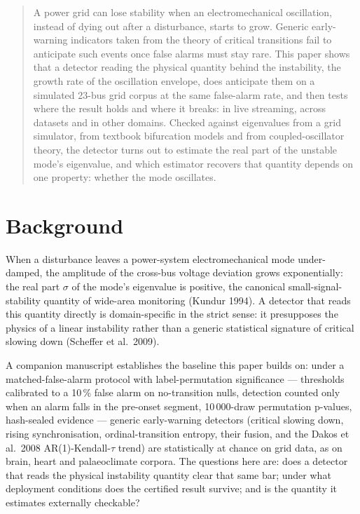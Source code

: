 \documentclass[aip,cha,preprint,amsmath,amssymb]{revtex4-2}
\begin{document}
\begin{quotation}
A power grid can lose stability when an electromechanical oscillation,
instead of dying out after a disturbance, starts to grow. Generic
early-warning indicators taken from the theory of critical transitions
fail to anticipate such events once false alarms must stay rare. This
paper shows that a detector reading the physical quantity behind the
instability, the growth rate of the oscillation envelope, does
anticipate them on a simulated 23-bus grid corpus at the same
false-alarm rate, and then tests where the result holds and where it
breaks: in live streaming, across datasets and in other domains.
Checked against eigenvalues from a grid simulator, from textbook
bifurcation models and from coupled-oscillator theory, the detector
turns out to estimate the real part of the unstable mode's eigenvalue,
and which estimator recovers that quantity depends on one property:
whether the mode oscillates.
\end{quotation}

\section{Background}\label{sec:background}

When a disturbance leaves a power-system electromechanical mode
under-damped, the amplitude of the cross-bus voltage deviation grows
exponentially: the real part $\sigma$ of the mode's eigenvalue is
positive, the canonical small-signal-stability quantity of wide-area
monitoring (Kundur 1994). A detector that reads this quantity directly
is domain-specific in the strict sense: it presupposes the physics of a
linear instability rather than a generic statistical signature of
critical slowing down (Scheffer et al.\ 2009).

A companion manuscript establishes the baseline this paper builds on:
under a matched-false-alarm protocol with label-permutation
significance --- thresholds calibrated to a 10\,\% false alarm on
no-transition nulls, detection counted only when an alarm falls in the
pre-onset segment, 10\,000-draw permutation p-values, hash-sealed
evidence --- generic early-warning detectors (critical slowing down,
rising synchronisation, ordinal-transition entropy, their fusion, and
the Dakos et al.\ 2008 AR(1)-Kendall-$\tau$ trend) are statistically at chance on
grid data, as on brain, heart and palaeoclimate corpora. The questions
here are: does a detector that reads the physical instability quantity
clear that same bar; under what deployment conditions does the
certified result survive; and is the quantity it estimates externally
checkable?
\end{document}
